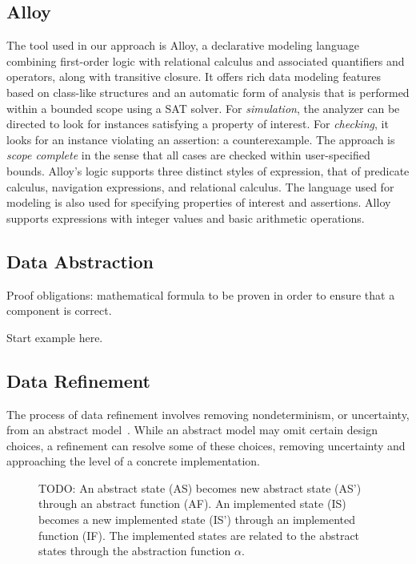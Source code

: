 \documentclass[11pt,conference]{IEEEtran}
\begin{document}
\subsection{Alloy}

The tool used in our approach is Alloy, a declarative modeling language combining first-order logic with relational calculus and associated quantifiers and operators, along with transitive closure.  It offers rich data modeling features based on class-like structures and an automatic form of analysis that is performed within a bounded scope using a SAT solver.  For \emph{simulation}, the analyzer can be directed to look for instances satisfying a property of interest.  For \emph{checking}, it looks for an instance violating an assertion: a counterexample.  The approach is \emph{scope complete} in the sense that all cases are checked within user-specified bounds.  Alloy's logic supports three distinct styles of expression, that of predicate calculus, navigation expressions, and relational calculus.  The language used for modeling is also used for specifying properties of interest and assertions.  Alloy supports expressions with integer values and basic arithmetic operations.

\subsection{Data Abstraction}

Proof obligations: mathematical formula to be proven in order to ensure that a component is correct.

Start example here.

\subsection{Data Refinement}

The process of data refinement involves removing nondeterminism, or uncertainty, from an abstract model~\cite{woodcock1996}.  While an abstract model may omit certain design choices, a refinement can resolve some of these choices, removing uncertainty and approaching the level of a concrete implementation.

\begin{figure}
\caption{TODO: An abstract state (AS) becomes new abstract state (AS') through an abstract function (AF).  An implemented state (IS) becomes a new implemented state (IS') through an implemented function (IF).  The implemented states are related to the abstract states through the abstraction function $\alpha$.}
\end{figure}
\end{document}
